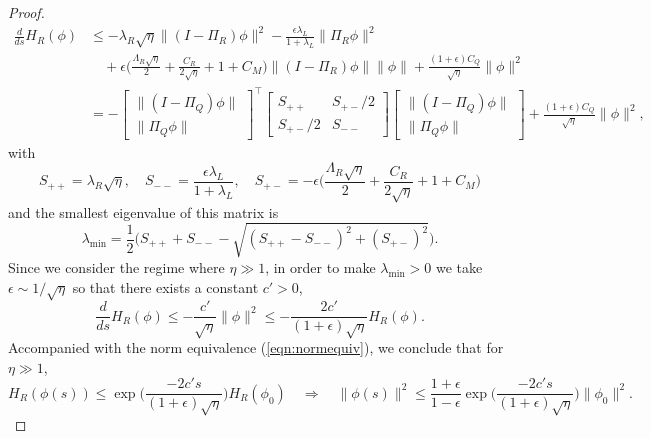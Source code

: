 \documentclass[10pt,a4paper]{amsart}
\begin{document}
\begin{proof}
\begin{equation}
\begin{aligned}
    \frac{d}{ds} H_R(\phi) &\leq -\lambda_R\sqrt{\eta}\|(I-\Pi_R)\phi\|^2-\frac{\epsilon\lambda_L}{1+\lambda_L} \|\Pi_R\phi\|^2\\
    &\quad+\epsilon\Big(\frac{\Lambda_R \sqrt{\eta}}{2}+\frac{C_R}{2\sqrt{\eta}}+1+C_M\Big)\|(I-\Pi_R)\phi\|\|\phi\|
  + \frac{(1+\epsilon)C_Q}{\sqrt{\eta}} \|\phi\|^2\\
    & = -\begin{bmatrix}
            \|(I-\Pi_Q)\phi\| \\
            \|\Pi_Q\phi\|
        \end{bmatrix}^\top \begin{bmatrix}
            S_{++} & S_{+-}/2\\
          S_{+-}/2 & S_{--}
        \end{bmatrix} \begin{bmatrix}
            \|(I-\Pi_Q)\phi\| \\
            \|\Pi_Q\phi\| 
        \end{bmatrix}+ \frac{(1+\epsilon) C_Q}{\sqrt{\eta}} \|\phi\|^2,
\end{aligned}
\end{equation}
with \begin{equation}
    S_{++} = \lambda_R\sqrt{\eta}, \quad S_{--} = \frac{\epsilon\lambda_L}{1+\lambda_L} , \quad S_{+-} = - \epsilon\Big(\frac{\Lambda_R \sqrt{\eta}}{2}+\frac{C_R}{2\sqrt{\eta}}+1+C_M\Big)
\end{equation}
and the smallest eigenvalue of this matrix is
\begin{equation}
    \lambda_{\min} = \frac{1}{2}\Big(S_{++} + S_{--}-\sqrt{(S_{++}-S_{--})^2+(S_{+-})^2}\Big).
\end{equation}
Since we consider the regime where $\eta\gg 1$, in order to make $\lambda_{\min}>0$ we take $\epsilon \sim 1/\sqrt{\eta}$ so that there exists a constant $c'>0$,
\begin{equation}
     \frac{d}{ds} H_R(\phi) \leq -\frac{c'}{\sqrt{\eta}} \|\phi\|^2\leq -\frac{2c'}{(1+\epsilon)\sqrt{\eta}} H_R(\phi).
\end{equation}
Accompanied with the norm equivalence (\ref{eqn:normequiv}), we conclude that for $\eta\gg1$, 
\begin{equation}
    H_R(\phi(s))\leq \exp\Big(\frac{-2c's}{(1+\epsilon)\sqrt{\eta}}\Big) H_R(\phi_0) \quad \Longrightarrow \quad \|\phi(s)\|^2 \leq \frac{1+\epsilon}{1-\epsilon}\exp\Big(\frac{-2c's}{(1+\epsilon)\sqrt{\eta}}\Big) \|\phi_0\|^2.
\end{equation}
\end{proof}
\end{document}

